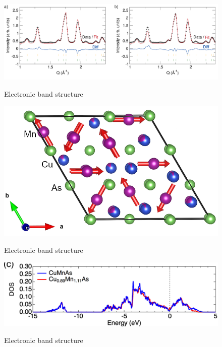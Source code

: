 \documentclass[11pt,edeposit,draftthesis]{uiucthesis2020}
\begin{document}
\begin{mainmatter}
\begin{figure}
\centering\includegraphics[width=\columnwidth]{figures/ch5/wand_refinement.png} \\
\caption{\label{fig:wand_refinement}
Electronic band structure
}
\end{figure}

\begin{figure}
\centering\includegraphics[width=\columnwidth]{figures/ch5/CuMnAs_magnetic_structure.png} \\
\caption{\label{fig:CuMnAs_magnetic_structure}
Electronic band structure
}
\end{figure}

\begin{figure}
\centering\includegraphics[width=\columnwidth]{figures/ch5/DOS_CuMnAs.png} \\
\caption{\label{fig:DOS}
Electronic band structure
}
\end{figure}


\end{mainmatter}
\end{document}
